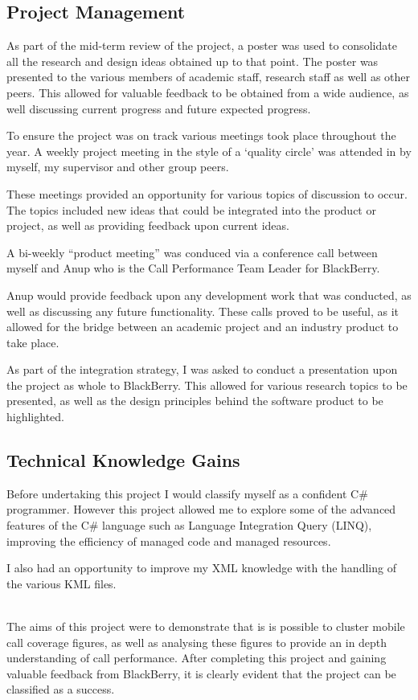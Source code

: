 \subsection{Project Management}
As part of the mid-term review of the project, a poster was used to consolidate
all the research and design ideas obtained up to that point. The poster was 
presented to the various members of academic staff, research staff as well as 
other peers. This allowed for valuable feedback to be obtained from a wide 
audience, as well discussing current progress and future expected progress.

To ensure the project was on track various meetings took place throughout the 
year. A weekly project meeting in the style of a `quality circle' was attended
in by myself, my supervisor and other group peers. 

These meetings provided an opportunity for various topics of discussion to 
occur. The topics included new ideas that could be integrated into the product 
or project, as well as providing feedback upon current ideas. 

A bi-weekly ``product meeting'' was conduced via a conference call between 
myself and Anup who is the Call Performance Team Leader for BlackBerry.

Anup would provide feedback upon any development work that was conducted, as 
well as discussing any future functionality. These calls proved to be useful, 
as it allowed for the bridge between an academic project and an industry 
product to take place.

As part of the integration strategy, I was asked to conduct a presentation upon
the project as whole to BlackBerry. This allowed for various research topics to
be presented, as well as the design principles behind the software product to 
be highlighted. 

\subsection{Technical Knowledge Gains}
Before undertaking this project I would classify myself as a confident C\# 
programmer. However this project allowed me to explore some of the advanced 
features of the C\# language such as Language Integration Query (LINQ), 
improving the efficiency of managed code and managed resources.

I also had an opportunity to improve my XML knowledge with the handling of the 
various KML files.

~\\

The aims of this project were to demonstrate that is is possible to cluster 
mobile call coverage figures, as well as analysing these figures to provide an 
in depth understanding of call performance. After completing this project and 
gaining valuable feedback from BlackBerry, it is clearly evident that the 
project can be classified as a success.